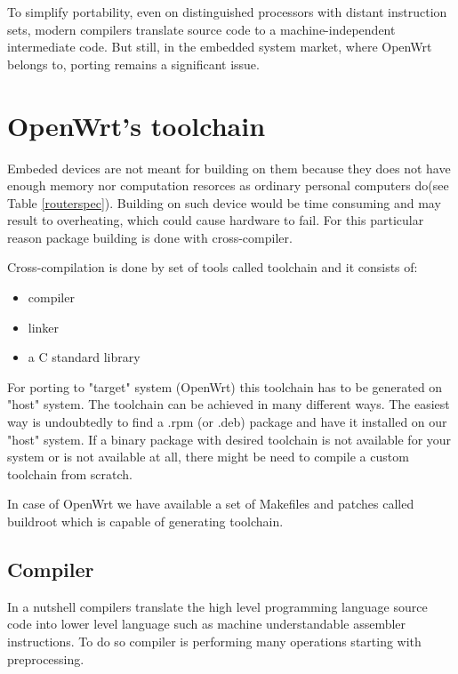 To simplify portability, even on distinguished processors with distant instruction sets, modern compilers translate source code to a machine-independent intermediate code.
But still, in the embedded system market, where OpenWrt belongs to, porting remains a significant issue.

\section{OpenWrt's toolchain } %

Embeded devices are not meant for building on them because they does not have enough memory nor computation resorces as ordinary personal computers do(see Table \ref{routerspec}).
Building on such device would be time consuming and may result to overheating, which could cause hardware to fail.
For this particular reason package building is done with cross-compiler.

Cross-compilation is done by set of tools called toolchain and it consists of:

\begin{itemize}
    \item compiler
    \item linker
    \item a C standard library
\end{itemize}

For porting to "target"  system (OpenWrt) this toolchain has to be generated on "host" system.
The toolchain can be achieved in many different ways.
The easiest way is undoubtedly to find a .rpm (or .deb) package and have it installed on our "host" system.
If a binary package with desired toolchain is not available for your system or is not available at all, there might be need to compile a custom toolchain from scratch.%

In case of OpenWrt we have available a set of Makefiles and patches called buildroot which is capable of generating toolchain.

\subsection{Compiler}

In a nutshell compilers translate the high level programming language source code into lower level language such as machine understandable assembler instructions.
To do so compiler is performing many operations starting with preprocessing.

